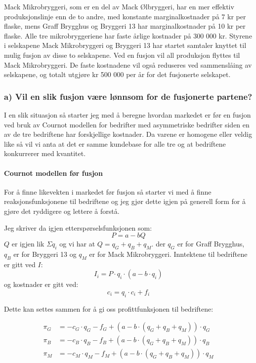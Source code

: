 \documentclass[
  12pt,
  a4paper,
  DIV=11,
  numbers=noendperiod]{scrartcl}
\let\oldparagraph\paragraph
\renewcommand{\paragraph}[1]{\oldparagraph{#1}\mbox{}}
\begin{document}
Mack Mikrobryggeri, som er en del av Mack Ølbryggeri, har en mer
effektiv produksjonslinje enn de to andre, med konstante
marginalkostnader på 7 kr per flaske, mens Graff Brygghus og Bryggeri 13
har marginalkostnader på 10 kr per flaske. Alle tre mikrobryggeriene har
faste årlige kostnader på 300 000 kr. Styrene i selskapene Mack
Mikrobryggeri og Bryggeri 13 har startet samtaler knyttet til mulig
fusjon av disse to selskapene. Ved en fusjon vil all produksjon flyttes
til Mack Mikrobryggeri. De faste kostnadene vil også reduseres ved
sammenslåing av selskapene, og totalt utgjøre kr 500 000 per år for det
fusjonerte selskapet.

\subsubsection{a) Vil en slik fusjon være lønnsom for de fusjonerte
partene?}\label{a-vil-en-slik-fusjon-vuxe6re-luxf8nnsom-for-de-fusjonerte-partene}

I en slik situasjon så starter jeg med å beregne hvordan markedet er før
en fusjon ved bruk av Cournot modellen for bedrifter med asymmetriske
bedrifter siden en av de tre bedriftene har forskjellige kostnader. Da
varene er homogene eller veldig like så vil vi anta at det er samme
kundebase for alle tre og at bedriftene konkurrerer med kvantitet.

\paragraph{Cournot modellen før
fusjon}\label{cournot-modellen-fuxf8r-fusjon}

For å finne likevekten i markedet før fusjon så starter vi med å finne
reaksjonsfunksjonene til bedriftene og jeg gjør dette igjen på generell
form for å gjøre det ryddigere og lettere å forstå.

Jeg skriver da igjen etterspørselsfunksjonen som: \[
P = a - bQ
\] \(Q\) er igjen lik \(\Sigma q_i\) og vi har at
\(Q = q_G + q_B + q_M\). der \(q_G\) er for Graff Brygghus, \(q_B\) er
for Bryggeri 13 og \(q_M\) er for Mack Mikrobryggeri. Inntektene til
bedriftene er gitt ved \(I\): \[
I_i = P \cdot q_i\cdot(a-b\cdot q_i)
\] og kostnader er gitt ved: \[
c_i = q_i \cdot c_i + f_i
\]

Dette kan settes sammen for å gi oss profittfunksjonen til bedriftene:

\begin{align*}
\pi_G &= -c_G\cdot q_G - f_G + (a-b\cdot(q_G+q_B+q_M))\cdot q_G \\
\pi_B &= -c_B\cdot q_B - f_B + (a-b\cdot(q_G+q_B+q_M))\cdot q_B \\
\pi_M &= -c_M\cdot q_M - f_M + (a-b\cdot(q_G+q_B+q_M))\cdot q_M
\end{align*}
\end{document}
